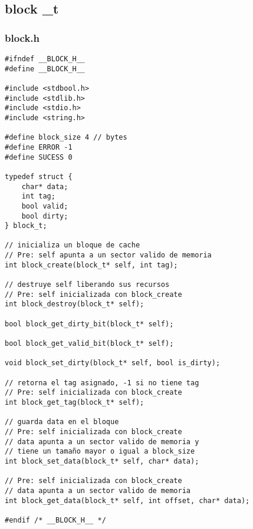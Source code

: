 \documentclass[a4paper,10pt]{article}
\begin{document}
 \subsection{block \_t}
 \subsubsection{block.h}
 \begin{verbatim}
#ifndef __BLOCK_H__
#define __BLOCK_H__

#include <stdbool.h>
#include <stdlib.h>
#include <stdio.h>
#include <string.h>

#define block_size 4 // bytes
#define ERROR -1
#define SUCESS 0

typedef struct {
	char* data;
	int tag;
	bool valid;
	bool dirty;
} block_t;

// inicializa un bloque de cache
// Pre: self apunta a un sector valido de memoria
int block_create(block_t* self, int tag);

// destruye self liberando sus recursos
// Pre: self inicializada con block_create
int block_destroy(block_t* self);

bool block_get_dirty_bit(block_t* self);

bool block_get_valid_bit(block_t* self);

void block_set_dirty(block_t* self, bool is_dirty);

// retorna el tag asignado, -1 si no tiene tag
// Pre: self inicializada con block_create
int block_get_tag(block_t* self);

// guarda data en el bloque
// Pre: self inicializada con block_create
// data apunta a un sector valido de memoria y
// tiene un tamaño mayor o igual a block_size
int block_set_data(block_t* self, char* data);

// Pre: self inicializada con block_create
// data apunta a un sector valido de memoria
int block_get_data(block_t* self, int offset, char* data);

#endif /* __BLOCK_H__ */
 \end{verbatim}
 
\end{document}
